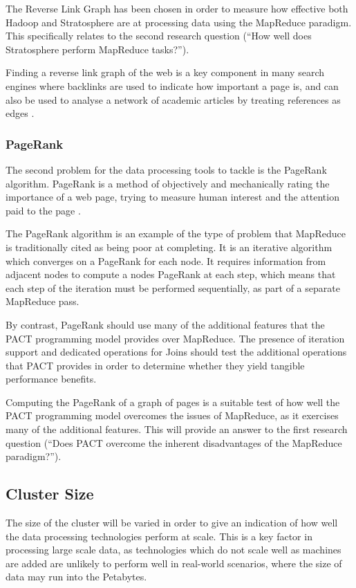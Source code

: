 The Reverse Link Graph has been chosen in order to measure how effective both Hadoop and Stratosphere are at processing data using the MapReduce paradigm. This specifically relates to the second research question (``How well does Stratosphere perform MapReduce tasks?'').

Finding a reverse link graph of the web is a key component in many search engines \cite{page1999pagerank} where backlinks are used to indicate how important a page is, and can also be used to analyse a network of academic articles by treating references as edges \cite{garfield2002algorithmic}. 

\subsubsection{PageRank}
The second problem for the data processing tools to tackle is the PageRank algorithm. PageRank is a method of objectively and mechanically rating the importance of a web page, trying to measure human interest and the attention paid to the page \cite{page1999pagerank}. 

The PageRank algorithm is an example of the type of problem that MapReduce is traditionally cited as being poor at completing. It is an iterative algorithm which converges on a PageRank for each node. It requires information from adjacent nodes to compute a nodes PageRank at each step, which means that each step of the iteration must be performed sequentially, as part of a separate MapReduce pass.

By contrast, PageRank should use many of the additional features that the PACT programming model provides over MapReduce. The presence of iteration support and dedicated operations for Joins should test the additional operations that PACT provides in order to determine whether they yield tangible performance benefits.

Computing the PageRank of a graph of pages is a suitable test of how well the PACT programming model overcomes the issues of MapReduce, as it exercises many of the additional features. This will provide an answer to the first research question (``Does PACT overcome the inherent disadvantages of the MapReduce paradigm?'').

\subsection{Cluster Size}
The size of the cluster will be varied in order to give an indication of how well the data processing technologies perform at scale. This is a key factor in processing large scale data, as technologies which do not scale well as machines are added are unlikely to perform well in real-world scenarios, where the size of data may run into the Petabytes.


